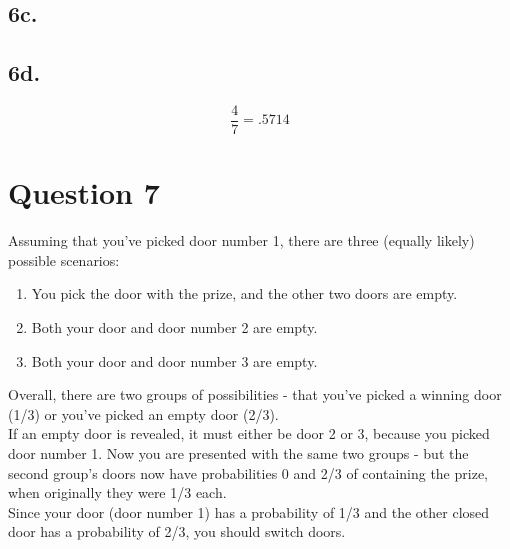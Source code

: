 \documentclass{article}
\begin{document}
\subsection{6c.}

\begin{center}
\end{center}



\subsection{6d.}
\begin{equation}
\frac{4}{7} = .5714
\end{equation}
\section{Question 7}

Assuming that you've picked door number 1, there are three (equally likely) possible scenarios:

\begin{enumerate}
\item You pick the door with the prize, and the other two doors are empty.
\item Both your door and door number 2 are empty.
\item Both your door and door number 3 are empty.
\end{enumerate}

Overall, there are two groups of possibilities - that you've picked a winning door (1/3) or you've picked an empty door (2/3).\\

If an empty door is revealed, it must either be door 2 or 3, because you picked door number 1. Now you are presented with the same two groups - but the second group's doors now have probabilities 0 and 2/3 of containing the prize, when originally they were 1/3 each.\\

Since your door (door number 1) has a probability of 1/3 and the other closed door has a probability of 2/3, you should switch doors.
\end{document}
